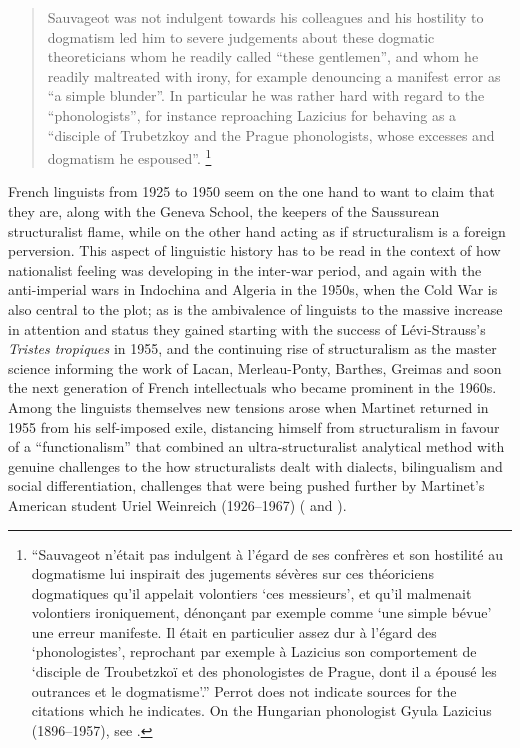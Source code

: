 \documentclass[output=paper]{langscibook}
\begin{document}
\begin{quotation}
Sauvageot was not indulgent towards his colleagues and his hostility to dogmatism led him to severe judgements about these dogmatic theoreticians whom he readily called ``these gentlemen'', and whom he readily maltreated with irony, for example denouncing a manifest error as ``a simple blunder''. In particular he was rather hard with regard to the ``phonologists'', for instance reproaching Lazicius for behaving as a ``disciple of Trubetzkoy and the Prague phonologists, whose excesses and dogmatism he espoused''. \citep[16]{Perrot2009}\footnote{``Sauvageot n'était pas indulgent à l'égard de ses confrères et son hostilité au dogmatisme lui inspirait des jugements sévères sur ces théoriciens dogmatiques qu'il appelait volontiers `ces messieurs', et qu'il malmenait volontiers ironiquement, dénonçant par exemple comme `une simple bévue' une erreur manifeste. Il était en particulier assez dur à l'égard des `phonologistes', reprochant par exemple à Lazicius son comportement de `disciple de Troubetzkoï et des phonologistes de Prague, dont il a épousé les outrances et le dogmatisme'.'' Perrot does not indicate sources for the citations which he indicates. On the Hungarian phonologist Gyula Lazicius (1896--1957), see \citet[288]{Voigt1986}.}
\end{quotation}

French linguists from 1925 to 1950 seem on the one hand to want to claim that they are, along with the Geneva School, the keepers of the Saussurean structuralist flame, while on the other hand acting as if structuralism is a foreign perversion. This aspect of linguistic history has to be read in the context of how nationalist feeling was developing in the inter-war period, and again with the anti-imperial wars in Indochina and Algeria in the 1950s, when the Cold War is also central to the plot; as is the ambivalence of linguists to the massive increase in attention and status they gained starting with the success of Lévi-Strauss's \emph{Tristes tropiques} in 1955, and the continuing rise of structuralism as the master science informing the work of Lacan, Merleau-Ponty, Barthes, Greimas and soon the next generation of French intellectuals who became prominent in the 1960s. Among the linguists themselves new tensions arose when Martinet returned in 1955 from his self-imposed exile, distancing himself from structuralism in favour of a ``functionalism'' that combined an ultra-structuralist analytical method with genuine challenges to the how structuralists dealt with dialects, bilingualism and social differentiation, challenges that were being pushed further by Martinet's American student Uriel Weinreich (1926--1967) (\citealt[see, e.g.,][]{Weinreich1954} and \citealt{Joseph2016}).
\end{document}
